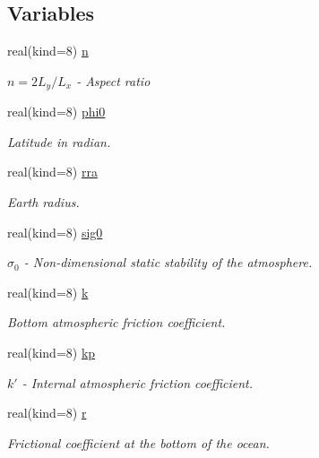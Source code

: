 \subsection*{Variables}
\begin{DoxyCompactItemize}
\item 
real(kind=8) \hyperlink{namespaceparams_abe66e904e07861ba1ef258ee92184e88}{n}
\begin{DoxyCompactList}\small\item\em $n = 2 L_y / L_x$ -\/ Aspect ratio \end{DoxyCompactList}\item 
real(kind=8) \hyperlink{namespaceparams_a7e58166ca3fb2153f781aa623c5c31e6}{phi0}
\begin{DoxyCompactList}\small\item\em Latitude in radian. \end{DoxyCompactList}\item 
real(kind=8) \hyperlink{namespaceparams_a192b2aa859cdeb4a0e285bcd0af346f4}{rra}
\begin{DoxyCompactList}\small\item\em Earth radius. \end{DoxyCompactList}\item 
real(kind=8) \hyperlink{namespaceparams_a9115211e1d9169ad56a3fa924c5f7ef3}{sig0}
\begin{DoxyCompactList}\small\item\em $\sigma_0$ -\/ Non-\/dimensional static stability of the atmosphere. \end{DoxyCompactList}\item 
real(kind=8) \hyperlink{namespaceparams_a6f40b299d2e21a177bf86afe5b06f790}{k}
\begin{DoxyCompactList}\small\item\em Bottom atmospheric friction coefficient. \end{DoxyCompactList}\item 
real(kind=8) \hyperlink{namespaceparams_a7474ac35238cf6acd2b02e7e6261b41d}{kp}
\begin{DoxyCompactList}\small\item\em $k'$ -\/ Internal atmospheric friction coefficient. \end{DoxyCompactList}\item 
real(kind=8) \hyperlink{namespaceparams_a714367f370ac26b8a281ebd6736407b7}{r}
\begin{DoxyCompactList}\small\item\em Frictional coefficient at the bottom of the ocean. \end{DoxyCompactList}\item 

\end{DoxyCompactItemize}
